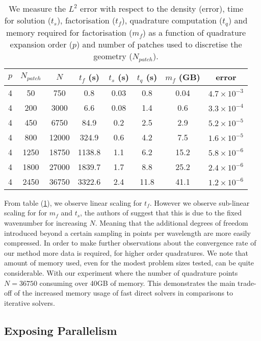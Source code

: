 \begin{table}[h!]
    \centering
    \begin{tabular}{||c c c c c c c c||} 
        \hline
        $p$ & $N_{patch}$ & $N$  & $t_f$ (s) & $t_s$ (s)  & $t_q$ (s) & $m_f$ (GB) & error \\ [0.5ex]
        \hline\hline
        4 & 50  & 750  & 0.8 & 0.03 & 0.8 & 0.04 & $4.7 \times 10^{-3}$ \\
        4 & 200 & 3000 & 6.6 & 0.08 & 1.4 & 0.6  & $3.3 \times 10^{-4}$ \\
        4 & 450 & 6750 & 84.9 & 0.2 & 2.5 & 2.9 & $5.2 \times 10^{-5}$ \\
        4 & 800 & 12000 & 324.9 & 0.6 & 4.2 & 7.5 & $1.6 \times 10^{-5}$ \\
        4 & 1250 & 18750 & 1138.8 & 1.1 & 6.2 & 15.2 & $5.8 \times 10^{-6}$ \\
        4 & 1800 & 27000 & 1839.7 & 1.7 & 8.8 & 25.2 & $2.4 \times 10^{-6}$ \\
        4 & 2450 & 36750 & 3322.6 & 2.4 & 11.8 & 41.1 & $1.2 \times 10^{-6}$ \\
        \hline
    \end{tabular}
    \caption{We measure the $L^2$ error with respect to the density  (error), time for solution ($t_s$), factorisation ($t_f$), quadrature computation ($t_q$) and memory required for factorisation ($m_f$) as a function of quadrature expansion order ($p$) and number of patches used to discretise the geometry ($N_{patch}$).}
    \label{table:sec_3_2:sh}
\end{table}


From table (\ref{table:sec_3_2:sh}), we observe linear scaling for $t_f$. However we observe sub-linear scaling for for $m_f$ and $t_s$, the authors of \cite{sushnikova2022fmm} suggest that this is due to the fixed wavenumber for increasing $N$. Meaning that the additional degrees of freedom introduced beyond a certain sampling in points per wavelength are more easily compressed. In order to make further observations about the convergence rate of our method more data is required, for higher order quadratures. We note that amount of memory used, even for the modest problem sizes tested, can be quite considerable. With our experiment where the number of quadrature points $N=36750$ consuming over 40GB of memory. This demonstrates the main trade-off of the increased memory usage of fast direct solvers in comparisons to iterative solvers.

\subsection*{Exposing Parallelism}

